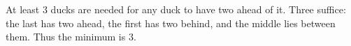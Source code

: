 At least 3 ducks are needed for any duck to have two ahead of it. Three suffice: the last has two ahead, the first has two behind, and the middle lies between them. Thus the minimum is $\boxed3$.
